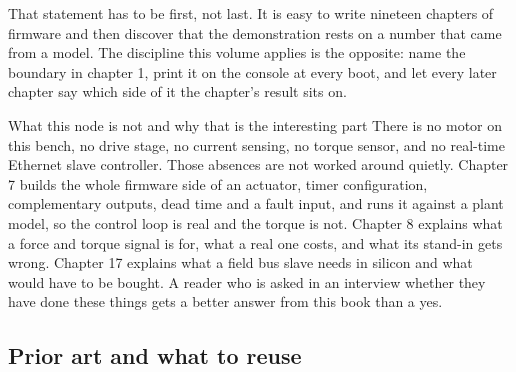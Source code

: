 That statement has to be first, not last. It is easy to write nineteen chapters
of firmware and then discover that the demonstration rests on a number that came
from a model. The discipline this volume applies is the opposite: name the
boundary in chapter 1, print it on the console at every boot, and let every
later chapter say which side of it the chapter's result sits on.

\begin{note}{What this node is not and why that is the interesting part}
There is no motor on this bench, no drive stage, no current sensing, no torque
sensor, and no real-time Ethernet slave controller. Those absences are not
worked around quietly. Chapter 7 builds the whole firmware side of an actuator,
timer configuration, complementary outputs, dead time and a fault input, and
runs it against a plant model, so the control loop is real and the torque is
not. Chapter 8 explains what a force and torque signal is for, what a real one
costs, and what its stand-in gets wrong. Chapter 17 explains what a field bus
slave needs in silicon and what would have to be bought. A reader who is asked
in an interview whether they have done these things gets a better answer from
this book than a yes.
\end{note}

\subsection*{Prior art and what to reuse}

